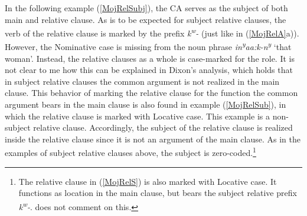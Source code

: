 In the following example (\ref{MojRelSubj}), the CA serves as the subject of both main and relative clause. 
As is to be expected for subject relative clauses, the verb of the relative clause is marked by the prefix \emph{k\textsuperscript{w}-} (just like in (\ref{MojRelA}a)).  
However, the Nominative case is missing from the noun phrase \emph{\textschwa in\textsuperscript{y}a\textglotstop a:k-n\textsuperscript{y}} `that woman'.
Instead, the relative clauses as a whole is case-marked for the role. 
It is not clear to me how this can be explained in Dixon's analysis, which holds that in subject relative clauses the common argument is not realized in the main clause.
This behavior of marking the relative clause for the function the common argument bears in the main clause is also found in example (\ref{MojRelSub}), in which the relative clause is marked with Locative case.
This example is a non-subject relative clause. 
Accordingly, the subject of the relative clause is realized inside the relative clause since it is not an argument of the main clause. 
As in the examples of subject relative clauses above, the subject is zero-coded.\footnote{The relative clause in (\ref{MojRelS}) is also marked with Locative case. 
It functions as location in the main clause, but bears the subject relative prefix \emph{k\textsuperscript{w}-}. 
\citet{Munro:1976} does not comment on this.} 
\enlargethispage{\baselineskip}

